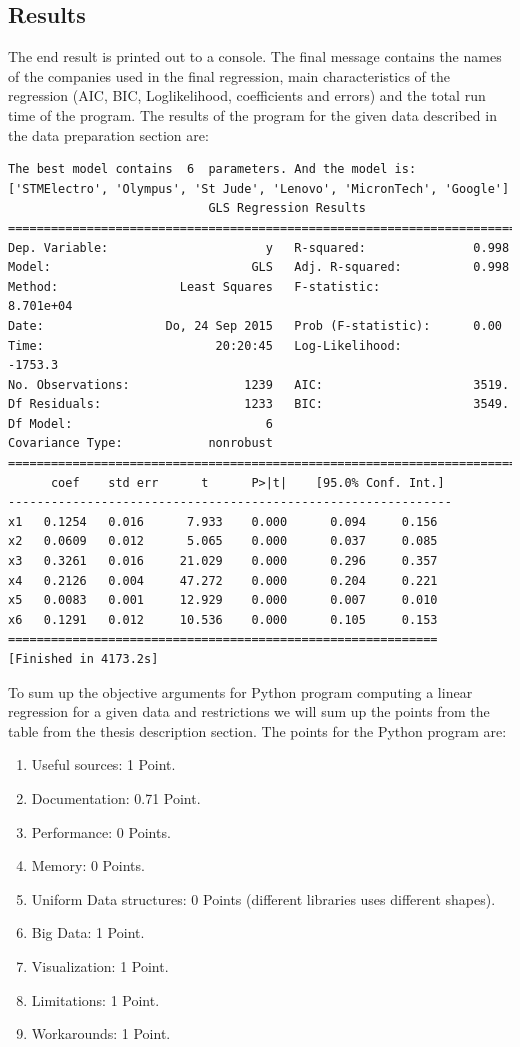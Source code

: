 \documentclass [twoside,
  11pt, a4paper,
  footinclude=true,
  headinclude=true,
  cleardoublepage=empty
]{article}
\begin{document}
\subsection{Results}
The end result is printed out to a console. The final message contains the names of the companies used in the final regression, main characteristics of the regression (AIC, BIC, Loglikelihood, coefficients and errors) and the total run time of the program. 
The results of the program for the given data described in the data preparation section are:
\begin{verbatim}
The best model contains  6  parameters. And the model is:
['STMElectro', 'Olympus', 'St Jude', 'Lenovo', 'MicronTech', 'Google']
                            GLS Regression Results                            
==========================================================================
Dep. Variable:                      y   R-squared:               0.998
Model:                            GLS   Adj. R-squared:          0.998
Method:                 Least Squares   F-statistic:             8.701e+04
Date:                 Do, 24 Sep 2015   Prob (F-statistic):      0.00
Time:                        20:20:45   Log-Likelihood:          -1753.3
No. Observations:                1239   AIC:                     3519.
Df Residuals:                    1233   BIC:                     3549.
Df Model:                           6                                         
Covariance Type:            nonrobust                                         
==========================================================================
      coef    std err      t      P>|t|    [95.0% Conf. Int.]
--------------------------------------------------------------
x1   0.1254   0.016      7.933    0.000      0.094     0.156
x2   0.0609   0.012      5.065    0.000      0.037     0.085
x3   0.3261   0.016     21.029    0.000      0.296     0.357
x4   0.2126   0.004     47.272    0.000      0.204     0.221
x5   0.0083   0.001     12.929    0.000      0.007     0.010
x6   0.1291   0.012     10.536    0.000      0.105     0.153
============================================================
[Finished in 4173.2s]
\end{verbatim}
To sum up the objective arguments for Python program computing a linear regression for a given data and restrictions we will sum up the points from the table from the thesis description section.
The points for the Python program are:
\begin{enumerate}
    \item Useful sources: 1 Point.
    \item Documentation: 0.71 Point.
    \item Performance: 0 Points.
    \item Memory: 0 Points.
    \item Uniform Data structures: 0 Points (different libraries uses different shapes).
    \item Big Data: 1 Point.
    \item Visualization: 1 Point.
    \item Limitations: 1 Point.
    \item Workarounds: 1 Point.
\end{enumerate} 
\end{document}
